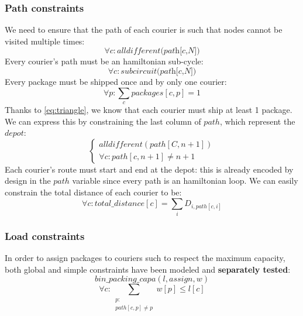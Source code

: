 \subsubsection{Path constraints}
We need to ensure that the path of each courier is such that nodes cannot be visited multiple times:
\begin{equation}
    \forall c : \textit{alldifferent(path[c,N])}
\end{equation}
Every courier's path must be an hamiltonian sub-cycle:
\begin{equation}
    \forall c : \textit{subcircuit(path[c,N])}
\end{equation}
Every package must be shipped once and by only one courier:
\begin{equation}
    \forall p : \sum_{c} packages[c,p] = 1
\end{equation}
Thanks to \eqref{eq:triangle}, we know that each courier must ship at least 1 package. We can express this by constraining the last column of $path$, which represent the $depot$:
\begin{equation}
\begin{cases}
    \textit{alldifferent}(path[C,n+1]) \\
    \forall c : path[c,n+1] \neq n+1
\end{cases}
\end{equation}
Each courier's route must start and end at the depot: this is already encoded by design in the $path$ variable since every path is an hamiltonian loop. We can easily constrain the total distance of each courier to be:
\begin{equation}
\forall c : total\_distance[c] =  \sum_{i} D_{i, path[c,i]}
\end{equation}



\subsubsection{Load constraints}
In order to assign packages to couriers such to respect the maximum capacity, both global and simple constraints have been modeled and \textbf{separately tested}:
\begin{equation}
\label{eq:load1}
    bin\_packing\_capa(l, assign, w)
\end{equation}
\begin{equation}
\label{eq:load2}
    \forall c : \sum_{\substack{p:\\ path[c,p] \neq p}} w[p] \leq l[c]
\end{equation}
